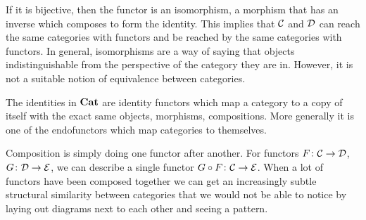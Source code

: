 If it is bijective, then the functor is an isomorphism, a morphism that has an
inverse which composes to form the identity. This implies that $\mathcal{C}$ and
$\mathcal{D}$ can reach the same categories with functors and be reached by the
same categories with functors. In general, isomorphisms are a way of saying that
objects indistinguishable from the perspective of the category they are in.
However, it is not a suitable notion of equivalence between categories.

The identities in $\operatorname{\mathbf{Cat}}$ are identity functors which map a category to a copy
of itself with the exact same objects, morphisms, compositions. More generally
it is one of the endofunctors which map categories to themselves.

Composition is simply doing one functor after another. For functors
$F\colon\mathcal{C}\to\mathcal{D}$, $G \colon \mathcal{D}\to\mathcal{E}$, we can
describe a single functor $G\circ F\colon\mathcal{C}\to\mathcal{E}$.  When a lot
of functors have been composed together we can get an increasingly subtle
structural similarity between categories that we would not be able to notice by
laying out diagrams next to each other and seeing a pattern.
%
